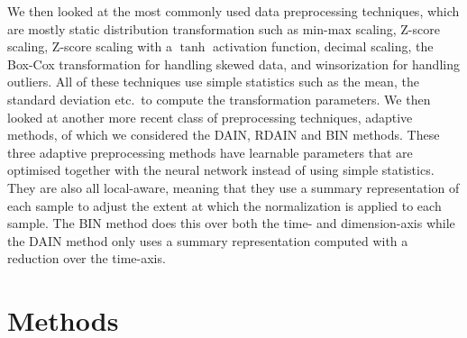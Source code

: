 \documentclass{statsmsc}
\begin{document}
{%
We then looked at the most commonly used data preprocessing techniques, which are mostly static
distribution transformation such as min-max scaling, Z-score scaling, Z-score scaling with a
$\tanh$ activation function, decimal scaling, the Box-Cox transformation for handling skewed data,
and winsorization for handling outliers. All of these techniques use simple statistics such as the
mean, the standard deviation etc.\ to compute the transformation parameters. We then looked at
another more recent class of preprocessing techniques, adaptive methods, of which we considered the
\ac{DAIN}, \ac{RDAIN} and \ac{BIN} methods. These three adaptive preprocessing
methods have learnable parameters that are optimised together with the neural
network instead of using simple statistics. They are also all local-aware, meaning that they use
a summary representation of each sample to adjust the extent at which the normalization is applied
to each sample. The \ac{BIN} method does this over both the time- and dimension-axis while the
\ac{DAIN} method only uses a summary representation computed with a reduction over the time-axis.


\chapter{Methods} %

}
\end{document}
